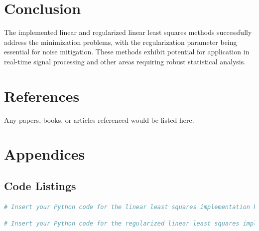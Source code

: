 \documentclass{article}
\begin{document}
\section{Conclusion}
The implemented linear and regularized linear least squares methods successfully address the minimization problems, with the regularization parameter being essential for noise mitigation. These methods exhibit potential for application in real-time signal processing and other areas requiring robust statistical analysis.

\section{References}
Any papers, books, or articles referenced would be listed here.

\section{Appendices}
\subsection{Code Listings}
\begin{lstlisting}[language=Python, caption=Linear Least Squares Implementation]
# Insert your Python code for the linear least squares implementation here.
\end{lstlisting}

\begin{lstlisting}[language=Python, caption=Regularized Linear Least Squares Implementation]
# Insert your Python code for the regularized linear least squares implementation here.
\end{lstlisting}

\end{document}
